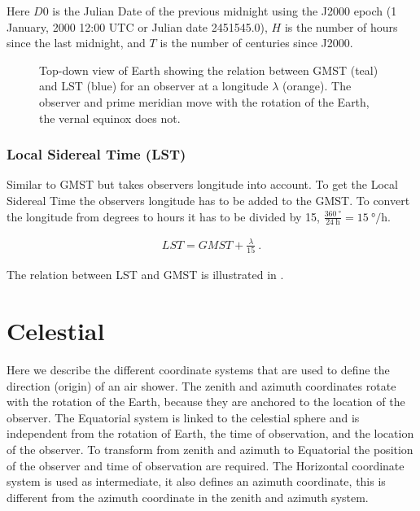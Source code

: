 Here $D0$ is the Julian Date of the previous midnight using the J2000
epoch (1 January, 2000 12:00 UTC or Julian date 2451545.0), $H$ is the
number of hours since the last midnight, and $T$ is the number of
centuries since J2000.

\begin{figure}
    \centering
    
    \caption{Top-down view of Earth showing the relation between GMST
             (teal) and LST (blue) for an observer at a longitude
             $\lambda$ (orange). The observer and prime meridian move with
             the rotation of the Earth, the vernal equinox does not.}
    \label{fig:wgs84_gmst_lst}
\end{figure}


\subsubsection{Local Sidereal Time (LST)}

Similar to GMST but takes observers longitude into account. To get the
Local Sidereal Time the observers longitude has to be added to the GMST.
To convert the longitude from degrees to hours it has to be divided by
15, $\frac{\SI{360}{\degree}}{\SI{24}{\hour}} =
\SI{15}{\degree\per\hour}$.

\begin{equation}
    \begin{array}{l}
        \mathit{LST} = \mathit{GMST} + \frac{\lambda}{15} \ .
    \end{array}
\end{equation}

The relation between LST and GMST is illustrated in
.


\section{Celestial}
\label{sec:celestial}

Here we describe the different coordinate systems that are used to
define the direction (origin) of an air shower. The zenith and azimuth
coordinates rotate with the rotation of the Earth, because they are
anchored to the location of the observer. The Equatorial system is
linked to the celestial sphere and is independent from the rotation of
Earth, the time of observation, and the location of the observer. To
transform from zenith and azimuth to Equatorial the position of the
observer and time of observation are required. The Horizontal coordinate
system is used as intermediate, it also defines an azimuth coordinate,
this is different from the azimuth coordinate in the zenith and azimuth
system.


